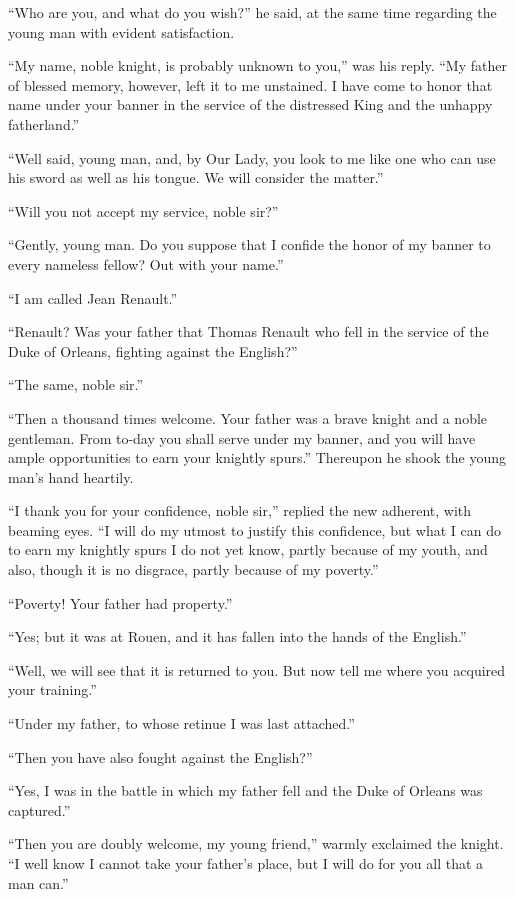 ``Who are you, and what do you wish?'' he said, at the same time
regarding the young man with evident satisfaction.

``My name, noble knight, is probably unknown to you,'' was his reply.
``My father of blessed memory, however, left it to me unstained. I have
come to honor that name under your banner in the service of the
distressed King and the unhappy fatherland.''

``Well said, young man, and, by Our Lady, you look to me like one who
can use his sword as well as his tongue. We will consider the matter.''

``Will you not accept my service, noble sir?''

``Gently, young man. Do you suppose that I confide the honor of my
banner to every nameless fellow? Out with your name.''

``I am called Jean Renault.''

``Renault? Was your father that Thomas Renault who fell in the service
of the Duke of Orleans, fighting against the English?''

``The same, noble sir.''

``Then a thousand times welcome. Your father was a brave knight and a
noble gentleman. From to-day you shall serve under my banner, and you
will have ample opportunities to earn your knightly spurs.'' Thereupon
he shook the young man's hand heartily.

``I thank you for your confidence, noble sir,'' replied the new
adherent, with beaming eyes. ``I will do my utmost to justify this
confidence, but what I can do to earn my knightly spurs I do not yet
know, partly because of my youth, and also, though it is no disgrace,
partly because of my poverty.''

``Poverty! Your father had property.''

``Yes; but it was at Rouen, and it has fallen into the hands of the
English.''

``Well, we will see that it is returned to you. But now tell me where
you acquired your training.''

``Under my father, to whose retinue I was last attached.''

``Then you have also fought against the English?''

``Yes, I was in the battle in which my father fell and the Duke of
Orleans was captured.''

``Then you are doubly welcome, my young friend,'' warmly exclaimed the
knight. ``I well know I cannot take your father's place, but I will do
for you all that a man can.''

